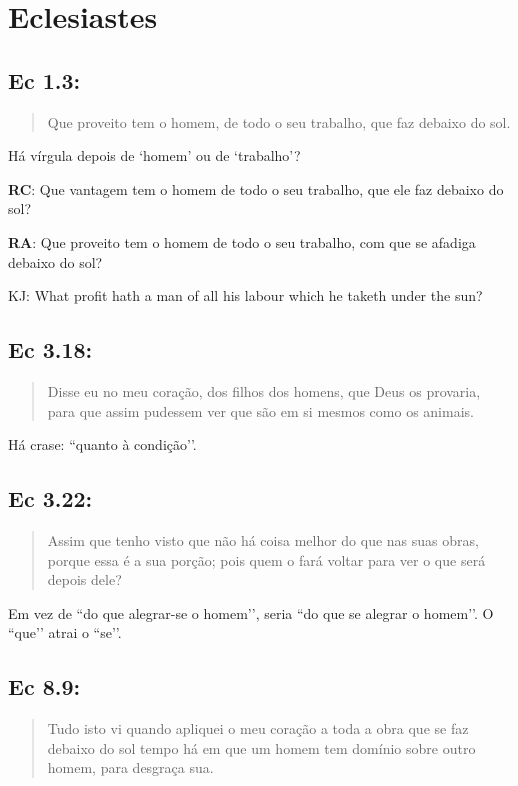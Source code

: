 \section{Eclesiastes}
\subsection*{Ec 1.3:} 
 \begin{quote} 
 Que proveito tem o homem, de todo o seu trabalho, que faz debaixo do sol.
\end{quote}

Há vírgula depois de `homem’ ou de `trabalho’?

\textbf{RC}: Que vantagem tem o homem de todo o seu trabalho, que ele faz debaixo do sol?

\textbf{RA}: Que proveito tem o homem de todo o seu trabalho, com que se afadiga debaixo do sol?

KJ: What profit hath a man of all his labour which he taketh under the sun?

\subsection*{Ec 3.18:} 
 \begin{quote} 
 Disse eu no meu coração,  dos filhos dos homens, que Deus os provaria, para que assim pudessem ver que são em si mesmos como os animais.
\end{quote}

Há crase: ``quanto à condição’’.

\subsection*{Ec 3.22:} 
 \begin{quote} 
 Assim que tenho visto que não há coisa melhor do que  nas suas obras, porque essa é a sua porção; pois quem o fará voltar para ver o que será depois dele?
\end{quote}

 Em vez de ``do que alegrar-se o homem’’, seria ``do que se alegrar o homem’’. O ``que’’ atrai o ``se’’.

\subsection*{Ec 8.9:} 
 \begin{quote} 
 Tudo isto vi quando apliquei o meu coração a toda a obra que se faz debaixo do sol\uwave{;} tempo há em que um homem tem domínio sobre outro homem, para desgraça sua.
 \end{quote}
 
